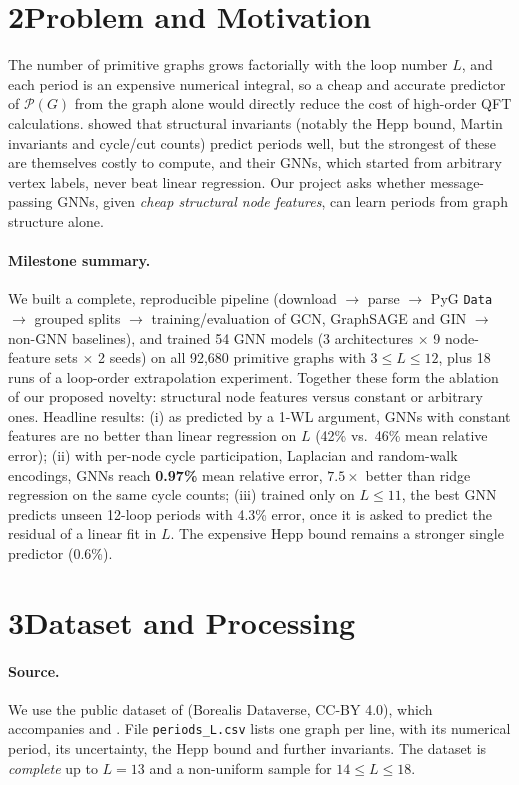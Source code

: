 \documentclass[11pt]{article}
\begin{document}
\section*{2\quad Problem and Motivation}

The number of primitive graphs grows factorially with the
loop number $L$, and each period is an expensive numerical integral, so a cheap and accurate
predictor of $\mathcal{P}(G)$ from the graph alone would directly reduce the cost of high-order QFT
calculations. \citet{balduf2024predicting} showed that structural invariants (notably the
Hepp bound, Martin invariants and cycle/cut counts) predict periods well, but the strongest of
these are themselves costly to compute, and their GNNs, which started from arbitrary vertex
labels, never beat linear regression. Our project asks whether message-passing GNNs, given
\emph{cheap structural node features}, can learn periods from graph structure alone.

\paragraph{Milestone summary.} We built a complete, reproducible pipeline (download $\to$ parse
$\to$ PyG \texttt{Data} $\to$ grouped splits $\to$ training/evaluation of GCN, GraphSAGE and GIN
$\to$ non-GNN baselines), and trained 54 GNN models (3 architectures $\times$ 9 node-feature sets
$\times$ 2 seeds) on all 92{,}680 primitive graphs with $3\le L\le 12$, plus 18 runs of a loop-order
extrapolation experiment. Together these form the ablation of our proposed novelty: structural
node features versus constant or arbitrary ones. Headline results: (i) as predicted by a 1-WL
argument, GNNs with constant features are no better than linear regression on $L$ (42\% vs.\ 46\%
mean relative error); (ii) with per-node cycle participation, Laplacian and random-walk encodings,
GNNs reach \textbf{0.97\%} mean relative error, $7.5\times$ better than ridge regression on the
same cycle counts; (iii) trained only on $L\le11$, the best GNN predicts unseen 12-loop periods with
4.3\% error, once it is asked to predict the residual of a linear fit in $L$. The expensive Hepp bound
remains a stronger single predictor (0.6\%).

\section*{3\quad Dataset and Processing}

\paragraph{Source.} We use the public dataset of \citet{balduf2024dataset} (Borealis Dataverse, CC-BY 4.0), which accompanies \citet{balduf2024predicting} and
\citet{balduf2023statistics}. File \texttt{periods\_L.csv} lists one graph per line, with its
numerical period, its uncertainty, the Hepp bound and further invariants. The dataset is
\emph{complete} up to $L=13$ and a non-uniform sample for $14\le L\le 18$.
\end{document}
